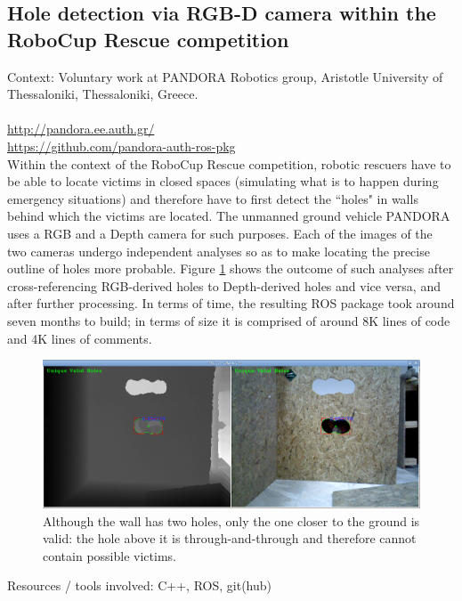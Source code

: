 \subsection{Hole detection via RGB-D camera within the RoboCup Rescue competition}

Context: Voluntary work at PANDORA Robotics group, Aristotle University of
Thessaloniki, Thessaloniki, Greece.\\\\
\url{http://pandora.ee.auth.gr/}\\
\url{https://github.com/pandora-auth-ros-pkg}\\

Within the context of the RoboCup Rescue competition, robotic rescuers have to
be able to locate victims in closed spaces (simulating what is to happen during
emergency situations) and therefore have to first detect the ``holes" in walls
behind which the victims are located. The unmanned ground vehicle PANDORA
uses a RGB and a Depth camera for such purposes. Each of the images of the two
cameras undergo independent analyses so as to make locating the precise
outline of holes more probable. Figure \ref{fig:holes} shows the outcome of
such analyses after cross-referencing RGB-derived holes to Depth-derived holes
and vice versa, and after further processing. In terms of time, the resulting
ROS package took around seven months to build; in terms of size it is comprised
of around 8K lines of code and 4K lines of comments.


\begin{figure}[H]\centering
  \includegraphics[scale=0.35]{images/unique_holes.png}
  \caption{Although the wall has two holes, only the one closer to the ground
    is valid: the hole above it is through-and-through and therefore cannot
    contain possible victims.}
  \label{fig:holes}
\end{figure}


Resources / tools involved: C++, ROS, git(hub)

